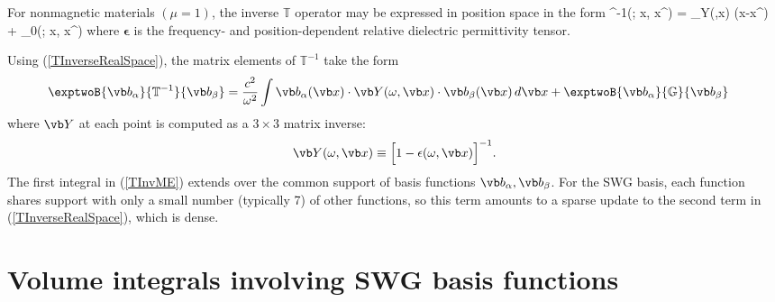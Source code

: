 \documentclass[letterpaper]{article}
\newcommand{\vbeps}{\boldsymbol{\epsilon}}
\begin{document}
For nonmagnetic materials $(\mu=1)$, the inverse $\mathbb{T}$ operator 
may be expressed in position space in the form
{^{-1}(\omega; \vb x, \vb x^\prime)
   = 
    \underbrace{
    \Big[1-\vbeps(\omega, \vb x)\Big]^{-1}
               }_{\vb Y(\omega,\vb x)}
    \delta(\vb x-\vb x^\prime)
    + _0(\omega; \vb x, \vb x^\prime)
}
where $\vbeps$ is the frequency- and position-dependent relative
dielectric permittivity tensor.

Using (\ref{TInverseRealSpace}), the matrix elements of $\mathbb{T}^{-1}$
take the form
\begin{align}
  \exptwoB{\vb b_\alpha}{\mathbb{T}^{-1}}{\vb b_\beta}
&=
  \frac{c^2}{\omega^2}
  \int \vb b_\alpha(\vb x) \cdot \vb Y(\omega,\vb x) \cdot \vb b_\beta(\vb x)
  \, d\vb x
  +
  \exptwoB{\vb b_\alpha}{\mathbb{G}}{\vb b_\beta}
\label{TInvME}
\end{align}
where $\vb Y$ at each point is computed as a $3\times 3$ matrix 
inverse:
$$\vb Y(\omega,\vb x) \equiv \Big[1 - \epsilon(\omega,\vb x)\Big]^{-1}.$$
The first integral in (\ref{TInvME}) extends over the common support of 
basis functions $\vb b_\alpha,\vb b_\beta$. For the SWG basis, each 
function shares support with only a small number (typically 7) of other 
functions, so this term amounts to a sparse update to the second term in 
(\ref{TInverseRealSpace}), which is dense.

\appendix 

\section{Volume integrals involving SWG basis functions}
\end{document}
